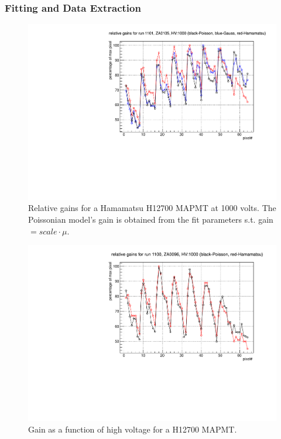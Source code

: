 \documentclass[prc,twocolumn]{revtex4}
\begin{document}
		\subsubsection*{Fitting and Data Extraction}	
	\begin{figure}
		\includegraphics[width=1.0\linewidth,page=1]{newreport_1101.pdf}
		\caption{Relative gains for a Hamamatsu H12700 MAPMT at 1000 volts. The Poissonian model's gain is obtained from the fit parameters s.t. gain $= scale \cdot \mu$.}
		\label{hamamatsu}
	\end{figure}
	\begin{figure}
		\includegraphics[width=1.0\linewidth,page=2]{hamamatsu.pdf}
		\caption{Gain as a function of high voltage for a H12700 MAPMT.}
		\label{gainhv}
	\end{figure}
\end{document}
